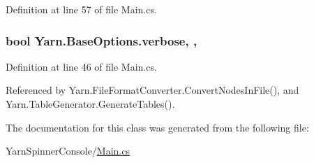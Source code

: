 Definition at line 57 of file Main.\-cs.

\hypertarget{a00040_ada4d83d1756918f362d55f6649b82b17}{
\subsubsection[{verbose}]{\setlength{\rightskip}{0pt plus 5cm}bool Yarn.\-Base\-Options.\-verbose\hspace{0.3cm}{\ttfamily [get]}, {\ttfamily [set]}, {\ttfamily [inherited]}}}\label{a00040_ada4d83d1756918f362d55f6649b82b17}


Definition at line 46 of file Main.\-cs.



Referenced by Yarn.\-File\-Format\-Converter.\-Convert\-Nodes\-In\-File(), and Yarn.\-Table\-Generator.\-Generate\-Tables().



The documentation for this class was generated from the following file\-:\begin{DoxyCompactItemize}
\item 
Yarn\-Spinner\-Console/\hyperlink{a00300}{Main.\-cs}\end{DoxyCompactItemize}
